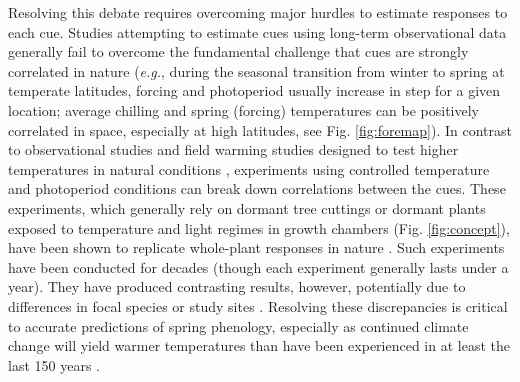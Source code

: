 \documentclass{article}
\begin{document}
\par Resolving this debate requires overcoming major hurdles to estimate responses to each cue. Studies attempting to estimate cues using long-term observational data \emph{\citep[e.g.,][]{zohner2016,vitasse2013}} generally fail to overcome the fundamental challenge that cues are strongly correlated in nature (\emph{e.g.}, during the seasonal transition from winter to spring at temperate latitudes, forcing and photoperiod usually increase in step for a given location; average chilling and spring (forcing) temperatures can be positively correlated in space, especially at high latitudes, see Fig. \ref{fig:foremap}). In contrast to observational studies and field warming studies designed to test higher temperatures in natural conditions \emph{\citep{Wolkovich:2012n}}, experiments using controlled temperature and photoperiod conditions can break down correlations between the cues. These experiments, which generally rely on dormant tree cuttings or dormant plants exposed to temperature and light regimes in growth chambers (Fig. \ref{fig:concept}), have been shown to replicate whole-plant responses in nature \emph{\citep{vitasse2014}}. Such experiments have been conducted for decades (though each experiment generally lasts under a year). They have produced contrasting results, however, potentially due to differences in focal species or study sites \emph{\citep{zohner2016,Caffarra:2011b,Laube:2014a,Basler:2012,Caffarra:2011a}}. Resolving these discrepancies is critical to accurate predictions of spring phenology, especially as continued climate change will yield warmer temperatures than have been experienced in at least the last 150 years \emph{\citep{ohlemuller2006,williams2007,williams2007b,ipcc2013,xu2018}}.

\end{document}
